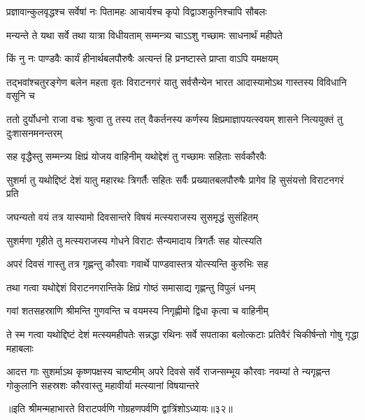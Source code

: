 \twolineshloka
{प्रज्ञावान्कुलवृद्धश्च सर्वेषां नः पितामहः}
{आचार्यश्च कृपो विद्वाञ्शकुनिश्चापि सौबलः}


\twolineshloka
{मन्यन्ते ते यथा सर्वे तथा यात्रा विधीयताम्}
{सम्मन्त्र्य चाऽऽशु गच्छामः साधनार्थं महीपते}


\twolineshloka
{किं नु नः पाण्डवैः कार्यं हीनार्थबलपौरुषैः}
{अत्यन्तं हि प्रनष्टास्ते प्राप्ता वाऽपि यमक्षयम्}


\threelineshloka
{तद्भवांश्चतुरङ्गेण बलेन महता वृतः}
{विराटनगरं यातु सर्वसैन्येन भारत}
{आदास्यामोऽथ गास्तस्य विविधानि वसूनि च}



\threelineshloka
{ततो दुर्योधनो राजा वचः श्रुत्वा तु तस्य तत्}
{वैकर्तनस्य कर्णस्य क्षिप्रमाज्ञापयत्स्वयम्}
{शासने नित्ययुक्तं तु दुःशासनमनन्तरम्}




\twolineshloka
{सह वृद्धैस्तु सम्मन्त्र्य क्षिप्रं योजय वाहिनीम्}
{यथोद्देशं तु गच्छामः सहिताः सर्वकौरवैः}


\threelineshloka
{सुशर्मा तु यथोद्दिष्टं देशं यातु महारथः}
{त्रिगर्तैः सहितः सर्वैः प्रख्यातबलपौरुषैः}
{प्रागेव हि सुसंयत्तो विराटनगरं प्रति}


\twolineshloka
{जघन्यतो वयं तत्र यास्यामो दिवसान्तरे}
{विषयं मत्स्यराजस्य सुसमृद्धं सुसंहितम्}


\twolineshloka
{सुशर्मणा गृहीते तु मत्स्यराजस्य गोधने}
{विराटः सैन्यमादाय त्रिगर्तैः सह योत्स्यति}


\twolineshloka
{अपरं दिवसं गास्तु तत्र गृह्णन्तु कौरवाः}
{गवार्थे पाण्डवास्तत्र योत्स्यन्ति कुरुभिः सह}


\twolineshloka
{तथा गत्वा यथोद्देशं विराटनगरान्तिके}
{क्षिप्रं गोष्ठं समासाद्य गृह्णन्तु विपुलं धनम्}


\twolineshloka
{गवां शतसहस्राणि श्रीमन्ति गुणवन्ति च}
{वयमस्य निगृह्णीमो द्विधा कृत्वा च वाहिनीम्}



\threelineshloka
{ते स्म गत्वा यथोद्दिष्टं देशं मत्स्यमहीपतेः}
{सन्नद्धा रथिनः सर्वे सपताका बलोत्कटाः}
{प्रतिवैरं चिकीर्षन्तो गोषु गृद्धा महाबलाः}


\onelineshloka
{आदत्त गाः सुशर्माऽथ कृष्णपक्षस्य चाष्टमीम्}
\threelineshloka
{अपरे दिवसे सर्वे राजन्सम्भूय कौरवाः}
{नवम्यां ते न्यगृह्णन्त गोकुलानि सहस्रशः}
{कौरवास्तु महावीर्या मत्स्यानां विषयान्तरे}

॥इति श्रीमन्महाभारते विराटपर्वणि गोग्रहणपर्वणि द्वात्रिंशोऽध्यायः॥३२॥


